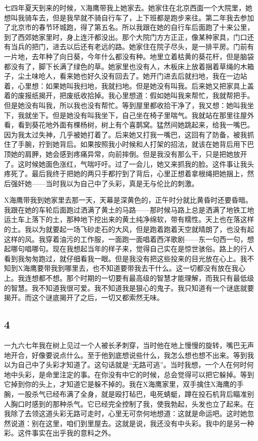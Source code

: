 七四年夏天到来的时候，X海鹰带我上她家去。她家住在北京西面一个大院里，她想叫我骑车去，但是我早就不骑自行车了，上下班都是跑步来往。第二年我去参加了北京市的春节环城跑，得了第五名。所以我跟在她的自行车后面跑了十来公里，到了西郊她家里时，身上连汗都没出。那个大院门方方正正，像某种家具，门口还有当兵的把门，进去以后还有老远的路。她家住在院子尽头，是一排平房。门前有一片地，去年种了向日葵，今年什么都没有种。地里立着枯黄的葵花杆，但是脑袋都没有了，脚下长满了绿色的草。她家里也没有人，木板床上放着捆着草绳的木箱子，尘土味呛人，看来她也好久没有回去了。她开门进去后就扫地，我在一边站着，心里想：如果她叫我扫地，我就扫地。但是她没有叫我。后来她又把家具上盖着的废报纸揭开，把废纸收拾掉。我心里想道：假如她叫我来帮忙，我就帮把手。但是她没有叫我，所以我也没有帮忙。等到屋里都收拾干净了，我又想：她叫我坐下，我就坐下。但是她没有叫我坐下，自己坐在椅子里喘气。我就站在那里往屋外看，看到葵花地外面有棵杨树，树上有个喜鹊窝。猛然间她跳起来，给我一嘴巴。因为我太过失神，几乎被她打着了。后来她又打我一嘴巴，这回有了防备，被我抓住了手腕，拧到她背后。如果按照我小时候和人打架的招法，就该在她背后用下巴顶她的肩胛，她会感到疼痛异常，向前摔倒。但是我没有那么干，只是把她放开了。这时候她面色涨红，气喘吁吁。过了一会儿，她又来抓我的脸。这件事让我头疼死了。最后我终于把她的两只手都拧到了背后，心里正想着拿根绳把她捆上，然后强奸她——当时我以为自己中了头彩，真是无与伦比的刺激。 

X海鹰带我到她家里去那一天，天幕是深黄色的，正午时分就比黄昏时还要昏暗。我跟在她的车轮后面跑过洒满了黄土的马路——那时候马路上总是洒满了地铁工地运土车上落下的土，那种地下挖出来的黄土纯净绵软，带有糯性。天上也在落这样的土。我以为就要起一场飞砂走石的大风，但是跑着跑着天空就晴朗了，也没有起这样的风。我穿着油污的工作服，一面跑一面唱着西洋歌剧——东一句西一句，想起哪句唱哪句。现在我想起当年的样子来，觉得自己实在是惊世骇俗。路上的行人看到我匆匆跑过，就仔细看我一眼。但是我没有把这些投来的目光放在心上。我不知到X海鹰要带我到哪里去，也不知道要带我去干什么。这一切都没有放在我心上。我连想都不想。那个时期的一切要有最高级的智慧才能理解，而我只有最低级的智慧。我不知道我很可爱。我不知道我是狠心的鬼子。我只知道有一个谜底就要揭开。而这个谜底揭开了之后，一切又都索然无味。 

\subsection{4} 

一九六七年我在树上见过一个人被长矛刺穿，当时他在地上慢慢的旋转，嘴巴无声地开合，好像要说点什么。至于他到底想说些什么，我怎么想也想不出来。等到我以为自己中了头彩才知道了。这句话就是“无路可逃”。当时我想，一个人在何时何地中头彩，是命里注定的事。在你没有中它的时候，总会觉得可以把它躲掉。等到它掉到你的头上，才知道它是躲不掉的。我在X海鹰家里，双手擒住X海鹰的手腕，一股杀气已经布满了全身，就是殴打毡巴，电死蜻蜓，蹲在投石机背后瞄准别人胸口时感到的那种杀气。它已经完全控制了我，使我勃起，头发也立了起来。在我除了去领这道头彩无路可走时，心里无可奈何地想道：这就是命运吧。这时她忽然说道：别在这里，咱们到里屋去。这就是说，我还没有中头彩。我中的是另一种彩。这件事实在出乎我的意料之外。 

